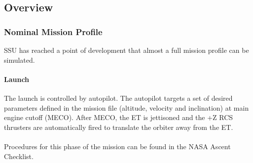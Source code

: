 \documentclass[13pt]{article}
\begin{document}
\subsection{Overview}
\begin{multicols*}{2}
\renewcommand{\cfttoctitlefont}{\bf}
\localtableofcontents

\subsubsection{Nominal Mission Profile}
SSU has reached a point of development that almost a full mission profile can be simulated.
\\
\paragraph{Launch}
The launch is controlled by autopilot. The autopilot targets a set of desired parameters defined in the mission file (altitude, velocity and inclination) at main engine cutoff (MECO).
After MECO, the ET is jettisoned and the +Z RCS thrusters are automatically fired to translate the orbiter away from the ET. \\
\\
Procedures for this phase of the mission can be found in the NASA Ascent Checklist.

\end{multicols*}
\end{document}

